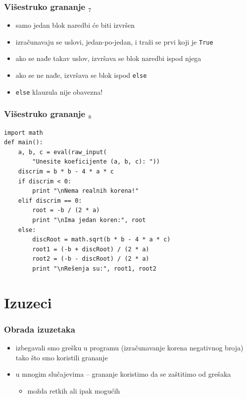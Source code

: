 \documentclass[utf8,compress]{beamer}
\begin{document}
\begin{frame}[fragile]
  \frametitle{Višestruko grananje $_7$}
  \begin{itemize}
    \item samo jedan blok naredbi će biti izvršen
    \item izračunavaju se uslovi, jedan-po-jedan, i traži se prvi koji je \texttt{True}
    \item ako se nađe takav uslov, izvršava se blok naredbi ispod njega
    \item ako se ne nađe, izvršava se blok ispod \texttt{else}
    \item \texttt{else} klauzula nije obavezna!
  \end{itemize}
\end{frame}

\begin{frame}[fragile,shrink=5]
  \frametitle{Višestruko grananje $_8$}
\begin{verbatim}
import math 
def main():
    a, b, c = eval(raw_input(
        "Unesite koeficijente (a, b, c): "))
    discrim = b * b - 4 * a * c
    if discrim < 0:
        print "\nNema realnih korena!"
    elif discrim == 0:
        root = -b / (2 * a)
        print "\nIma jedan koren:", root
    else:
        discRoot = math.sqrt(b * b - 4 * a * c)
        root1 = (-b + discRoot) / (2 * a)
        root2 = (-b - discRoot) / (2 * a)
        print "\nRešenja su:", root1, root2
\end{verbatim}
\end{frame}

\section{Izuzeci}

\begin{frame}[fragile]
  \frametitle{Obrada izuzetaka}
  \begin{itemize}
    \item izbegavali smo grešku u programu (izračunavanje korena negativnog broja) tako što smo koristili grananje
    \item u mnogim slučajevima -- grananje koristimo da se zaštitimo od grešaka
    \begin{itemize}
      \item možda retkih ali ipak mogućih
    \end{itemize}
  \end{itemize}
\end{frame}
\end{document}
